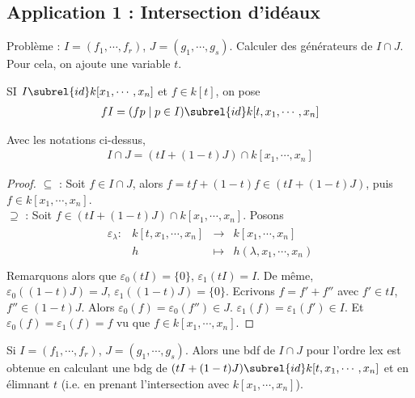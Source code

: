         \subsection{Application 1 : Intersection d'idéaux}
            Problème : $I = (f_1, \cdots, f_r)$, $J = (g_1, \cdots, g_s)$. Calculer des générateurs de $I \cap J$. Pour cela, on ajoute une variable $t$. 
            \begin{nota}
                SI $I \subrel{id} k[x_1, \cdots, x_n]$ et $f \in k[t]$, on pose
                \begin{align*}
                    fI = (fp \mid p \in I) \subrel{id} k[t, x_1, \cdots, x_n]
                \end{align*}
            \end{nota}
            \begin{theo}
                Avec les notations ci-dessus,
                \begin{align*}
                    I \cap J = (tI + (1 - t)J) \cap k[x_1, \cdots, x_n]
                \end{align*}
            \end{theo}
            \begin{proof}
                $\subseteq$ : Soit $f \in I \cap J$, alors $f = tf + (1 - t)f \in (tI + (1 - t)J)$, puis $f \in k[x_1, \cdots, x_n]$. \\
                $\supseteq$ : Soit $f \in (tI + (1-t)J) \cap k[x_1, \cdots, x_n]$. Posons
                \begin{align*}
                    \begin{array}{cccc}
                        \varepsilon_\lambda : & k[t,x_1, \cdots, x_n] & \to & k[x_1, \cdots, x_n] \\
                        & h & \mapsto & h(\lambda, x_1, \cdots, x_n) \\
                    \end{array}
                \end{align*}
                Remarquons alors que $\varepsilon_0(tI) = \{0\}$, $\varepsilon_1(tI) = I$. De même, $\varepsilon_0((1-t)J) = J$, $\varepsilon_1((1-t)J) = \{0\}$. Ecrivons $f = f' + f''$ avec $f' \in tI$, $f'' \in (1 - t)J$. Alors $\varepsilon_0(f) = \varepsilon_0(f'') \in J$. $\varepsilon_1(f) = \varepsilon_1(f') \in I$. Et $\varepsilon_0(f) = \varepsilon_1(f) = f$ vu que $f \in k[x_1, \cdots, x_n]$.
            \end{proof}
            \begin{coro}
                Si $I = (f_1, \cdots, f_r)$, $J = (g_1, \cdots, g_s)$. Alors une bdf de $I \cap J$ pour l'ordre lex est obtenue en calculant une bdg de $(tI + (1 - t)J) \subrel{id} k[t, x_1, \cdots, x_n]$ et en élimnant $t$ (i.e. en prenant l'intersection avec $k[x_1, \cdots, x_n]$).
            \end{coro}
            
